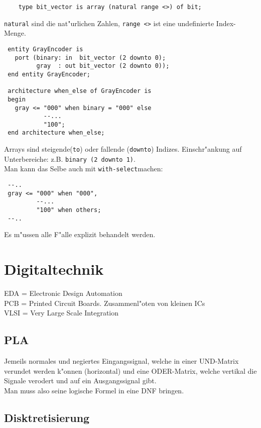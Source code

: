 \documentclass[german, 10pt, a4paper, twocolumn]{scrartcl}
\theoremstyle{definition}
\begin{document}
\begin{verbatim}
	type bit_vector is array (natural range <>) of bit;
\end{verbatim}

\texttt{natural} sind die nat"urlichen Zahlen, \verb#range <># ist eine undefinierte Index-Menge.

\begin{verbatim}
 entity GrayEncoder is
   port (binary: in  bit_vector (2 downto 0);
         gray  : out bit_vector (2 downto 0)); 
 end entity GrayEncoder;

 architecture when_else of GrayEncoder is
 begin
   gray <= "000" when binary = "000" else
           --...
           "100";
 end architecture when_else;
\end{verbatim}

Arrays sind steigende(\texttt{to}) oder fallende (\texttt{downto}) Indizes. Einschr"ankung auf Unterbereiche: z.B. \texttt{binary (2 downto 1)}.\\

Man kann das Selbe auch mit \texttt{with-select}machen:
\begin{verbatim}
 --..
 gray <= "000" when "000",
         --...
         "100" when others;
 --..
\end{verbatim}

Es m"ussen alle F"alle explizit behandelt werden.

\section{Digitaltechnik}

EDA = Electronic Design Automation\\
PCB = Printed Circuit Boards. Zusammenl"oten von kleinen ICs\\
VLSI = Very Large Scale Integration

\subsection{PLA}

Jemeils normales und negiertes Eingangssignal, welche in einer UND-Matrix verundet werden k"onnen (horizontal) und eine ODER-Matrix, welche vertikal die Signale verodert und auf ein Ausgangssignal gibt.\\
Man muss also seine logische Formel in eine DNF bringen.

\subsection{Disktretisierung}
\end{document}
